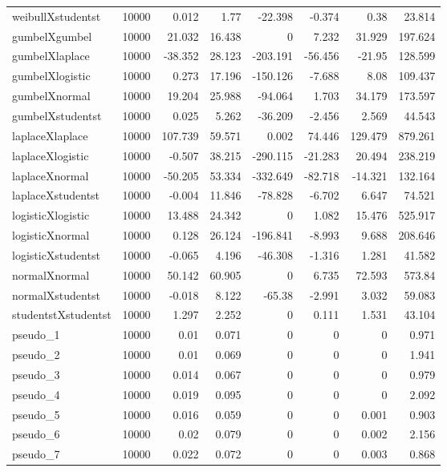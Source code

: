 \begin{table}[!htbp]
{\begin{tabular}{lrrrrrrr}
weibullXstudentst & 10000 & 0.012 & 1.77 & -22.398 & -0.374 & 0.38 & 23.814 \\ 
gumbelXgumbel & 10000 & 21.032 & 16.438 & 0 & 7.232 & 31.929 & 197.624 \\ 
gumbelXlaplace & 10000 & -38.352 & 28.123 & -203.191 & -56.456 & -21.95 & 128.599 \\ 
gumbelXlogistic & 10000 & 0.273 & 17.196 & -150.126 & -7.688 & 8.08 & 109.437 \\ 
gumbelXnormal & 10000 & 19.204 & 25.988 & -94.064 & 1.703 & 34.179 & 173.597 \\ 
gumbelXstudentst & 10000 & 0.025 & 5.262 & -36.209 & -2.456 & 2.569 & 44.543 \\ 
laplaceXlaplace & 10000 & 107.739 & 59.571 & 0.002 & 74.446 & 129.479 & 879.261 \\ 
laplaceXlogistic & 10000 & -0.507 & 38.215 & -290.115 & -21.283 & 20.494 & 238.219 \\ 
laplaceXnormal & 10000 & -50.205 & 53.334 & -332.649 & -82.718 & -14.321 & 132.164 \\ 
laplaceXstudentst & 10000 & -0.004 & 11.846 & -78.828 & -6.702 & 6.647 & 74.521 \\ 
logisticXlogistic & 10000 & 13.488 & 24.342 & 0 & 1.082 & 15.476 & 525.917 \\ 
logisticXnormal & 10000 & 0.128 & 26.124 & -196.841 & -8.993 & 9.688 & 208.646 \\ 
logisticXstudentst & 10000 & -0.065 & 4.196 & -46.308 & -1.316 & 1.281 & 41.582 \\ 
normalXnormal & 10000 & 50.142 & 60.905 & 0 & 6.735 & 72.593 & 573.84 \\ 
normalXstudentst & 10000 & -0.018 & 8.122 & -65.38 & -2.991 & 3.032 & 59.083 \\ 
studentstXstudentst & 10000 & 1.297 & 2.252 & 0 & 0.111 & 1.531 & 43.104 \\ 
pseudo\_1 & 10000 & 0.01 & 0.071 & 0 & 0 & 0 & 0.971 \\ 
pseudo\_2 & 10000 & 0.01 & 0.069 & 0 & 0 & 0 & 1.941 \\ 
pseudo\_3 & 10000 & 0.014 & 0.067 & 0 & 0 & 0 & 0.979 \\ 
pseudo\_4 & 10000 & 0.019 & 0.095 & 0 & 0 & 0 & 2.092 \\ 
pseudo\_5 & 10000 & 0.016 & 0.059 & 0 & 0 & 0.001 & 0.903 \\ 
pseudo\_6 & 10000 & 0.02 & 0.079 & 0 & 0 & 0.002 & 2.156 \\ 
pseudo\_7 & 10000 & 0.022 & 0.072 & 0 & 0 & 0.003 & 0.868 \\ 

\end{tabular}}
\end{table}
